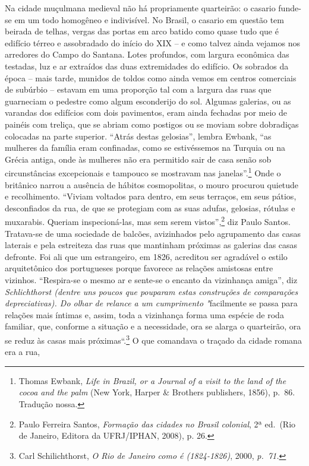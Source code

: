Na cidade muçulmana medieval não há propriamente quarteirão: o casario
funde-se em um todo homogêneo e indivisível. No Brasil, o casario em
questão tem beirada de telhas, vergas das portas em arco batido como
quase tudo que é edifício térreo e assobradado do início do XIX -- e
como talvez ainda vejamos nos arredores do Campo do Santana. Lotes
profundos, com largura econômica das testadas, luz e ar extraídos das
duas extremidades do edifício. Os sobrados da época -- mais tarde,
munidos de toldos como ainda vemos em centros comerciais de subúrbio --
estavam em uma proporção tal com a largura das ruas que guarneciam o
pedestre como algum esconderijo do sol. Algumas galerias, ou as varandas
dos edifícios com dois pavimentos, eram ainda fechadas por meio de
painéis com treliça, que se abriam como postigos ou se moviam sobre
dobradiças colocadas na parte superior. ``Atrás destas gelosias'',
lembra Ewbank, ``as mulheres da família eram confinadas, como se
estivéssemos na Turquia ou na Grécia antiga, onde às mulheres não era
permitido sair de casa senão sob circunstâncias excepcionais e tampouco
se mostravam nas janelas''.\footnote{Thomas Ewbank, \emph{Life in
  Brazil, or a Journal of a visit to the land of the cocoa and the palm}
  (New York, Harper \& Brothers publishers, 1856), p.~86. Tradução
  nossa.} Onde o britânico narrou a ausência de hábitos cosmopolitas, o
mouro procurou quietude e recolhimento. ``Viviam voltados para dentro,
em seus terraços, em seus pátios, desconfiados da rua, de que se
protegiam com as suas adufas, gelosias, rótulas e muxarabis. Queriam
inspecioná-las, mas sem serem vistos'',\footnote{Paulo Ferreira Santos,
  \emph{Formação das cidades no Brasil colonial}, 2ª ed.~(Rio de
  Janeiro, Editora da UFRJ/IPHAN, 2008), p. 26.} diz Paulo Santos.
Tratava-se de uma sociedade de balcões, avizinhados pelo agrupamento das
casas laterais e pela estreiteza das ruas que mantinham próximas as
galerias das casas defronte. Foi ali que um estrangeiro, em 1826,
acreditou ser agradável o estilo arquitetônico dos portugueses porque
favorece as relações amistosas entre vizinhos. ``Respira-se o mesmo ar e
sente-se o encanto da vizinhança amiga'', diz \emph{Schlichthorst
(dentre uns poucos que pouparam estas construções de comparações
depreciativas). Do olhar de relance a um cumprimento "}facilmente se
passa para relações mais íntimas e, assim, toda a vizinhança forma uma
espécie de roda familiar, que, conforme a situação e a necessidade, ora
se alarga o quarteirão, ora se reduz às casas mais próximas``.\footnote{Carl
  Schilichthorst, \emph{O Rio de Janeiro como é (1824-1826)}, 2000,
  \emph{p.~71.}} O que comandava o traçado da cidade romana era a rua,
